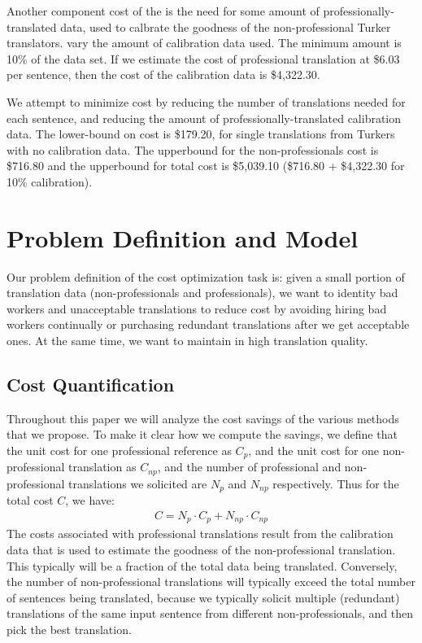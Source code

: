 \documentclass[11pt]{article}
\begin{document}
Another component cost of the   is the need for some amount of professionally-translated data, used to calbrate the goodness of the non-professional Turker translators.   vary the amount of calibration data used.  The minimum amount is 10\% of the data set.  If we estimate the cost of professional translation at \$6.03 per sentence, then the cost of the calibration data is \$4,322.30.

We attempt to minimize cost by reducing the number of translations needed for each sentence, and reducing the amount of professionally-translated calibration data.  The lower-bound on cost is \$179.20, for single translations from Turkers with no calibration data.  The upperbound for the non-professionals cost is \$716.80 and the upperbound for total cost is \$5,039.10 (\$716.80 + \$4,322.30 for 10\% calibration).
\section{Problem Definition and Model}
Our problem definition of the cost optimization task is: given a small portion of translation data (non-professionals and professionals),  we want to identity bad workers and unacceptable translations to reduce cost by avoiding hiring bad workers continually or purchasing redundant translations after we get acceptable ones. At the same time, we want to maintain in high translation quality.
\subsection{Cost Quantification}
Throughout this paper we will analyze the cost savings of the various methods that we propose.
To make it clear how we compute the savings, we define that the unit cost for one professional reference as $C_{p}$, and the unit cost for one non-professional translation as $C_{np}$, and the number of professional and non-professional translations  we solicited are $N_{p}$ and $N_{np}$ respectively. Thus for the total cost $C$, we have:\\
  \begin{align*}
  C = N_{p} \cdot C_{p}  + N_{np} \cdot C_{np} 
  \end{align*}
The costs associated with professional translations result from the calibration data  that is used to estimate the goodness of the non-professional translation.  This typically will be a fraction of the total data being translated.  Conversely, the number of non-professional translations will typically exceed the total number of sentences being translated, because we typically solicit multiple (redundant) translations of the same input sentence from different non-professionals, and then pick the best translation. 
  
\end{document}

